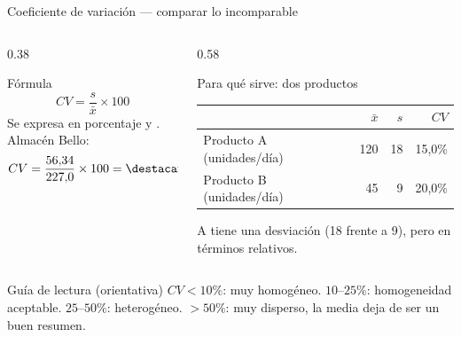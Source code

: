 \documentclass[aspectratio=169,10pt]{beamer}
\begin{document}
\begin{frame}{Coeficiente de variación — comparar lo incomparable}
  \footnotesize
  \begin{columns}[T,onlytextwidth]
    \begin{column}{0.38\textwidth}
      \begin{block}{Fórmula}
        \scriptsize
        \[ CV = \frac{s}{\bar{x}} \times 100 \]
        Se expresa en porcentaje y .
        \vspace{0.1cm}
        Almacén Bello:
        \[ CV = \frac{56{,}34}{227{,}0}\times 100 = \destacar{24{,}8\%} \]
      \end{block}
    \end{column}
    \begin{column}{0.58\textwidth}
      \begin{exampleblock}{Para qué sirve: dos productos}
        \scriptsize
        \begin{tabular}{@{}lrrr@{}}
          \toprule
          & \textbf{$\bar{x}$} & \textbf{$s$} & \textbf{$CV$} \\
          \midrule
          Producto A (unidades/día) & 120 & 18 & 15{,}0\% \\
          Producto B (unidades/día) &  45 &  9 & 20{,}0\% \\
          \bottomrule
        \end{tabular}
        \vspace{0.1cm}
        A tiene una desviación  (18 frente a 9), pero
         en términos relativos.
      \end{exampleblock}
    \end{column}
  \end{columns}

  \vspace{0.1cm}
  \begin{alertblock}{Guía de lectura (orientativa)}
    \scriptsize
    $CV < 10\%$: muy homogéneo. \quad $10$–$25\%$: homogeneidad
    aceptable. \quad $25$–$50\%$: heterogéneo. \quad $> 50\%$: muy
    disperso, la media deja de ser un buen resumen.
  \end{alertblock}
\end{frame}
\end{document}

